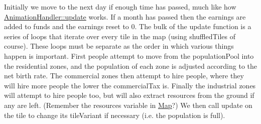 Initially we move to the next day if enough time has passed, much like how {\ttfamily \mbox{\hyperlink{classAnimationHandler_a6393ee5494fca5e4c7ced3c542e76b6e}{Animation\+Handler\+::update}}} works. If a month has passed then the {\ttfamily earnings} are added to {\ttfamily funds} and the {\ttfamily earnings} reset to 0. The bulk of the {\ttfamily update} function is a series of loops that iterate over every {\ttfamily tile} in the {\ttfamily map} (using {\ttfamily shuffled\+Tiles} of course). These loops must be separate as the order in which various things happen is important. First people attempt to move from the {\ttfamily population\+Pool} into the residential zones, and the population of each zone is adjusted according to the net birth rate. The commercial zones then attempt to hire people, where they will hire more people the lower the {\ttfamily commercial\+Tax} is. Finally the industrial zones will attempt to hire people too, but will also extract resources from the ground if any are left. (Remember the {\ttfamily resources} variable in {\ttfamily \mbox{\hyperlink{classMap}{Map}}}?) We then call {\ttfamily update} on the {\ttfamily tile} to change its {\ttfamily tile\+Variant} if necessary (i.\+e. the population is full).


